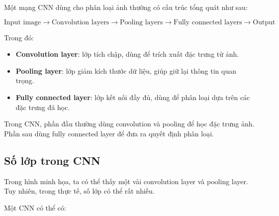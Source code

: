 Một mạng CNN dùng cho phân loại ảnh thường có cấu trúc tổng quát như sau:

\[
    \text{Input image}
    \rightarrow
    \text{Convolution layers}
    \rightarrow
    \text{Pooling layers}
    \rightarrow
    \text{Fully connected layers}
    \rightarrow
    \text{Output}
\]

Trong đó:

\begin{itemize}
    \item \textbf{Convolution layer}: lớp tích chập, dùng để trích xuất đặc trưng từ ảnh.
    \item \textbf{Pooling layer}: lớp giảm kích thước dữ liệu, giúp giữ lại thông tin quan trọng.
    \item \textbf{Fully connected layer}: lớp kết nối đầy đủ, dùng để phân loại dựa trên các đặc trưng đã học.
\end{itemize}

\begin{center}
\end{center}

\begin{ghinho}
Trong CNN, phần đầu thường dùng convolution và pooling để học đặc trưng ảnh. Phần sau dùng fully connected layer để đưa ra quyết định phân loại.
\end{ghinho}

\subsection{Số lớp trong CNN}

Trong hình minh họa, ta có thể thấy một vài convolution layer và pooling layer. Tuy nhiên, trong thực tế, số lớp có thể rất nhiều.

Một CNN có thể có:

